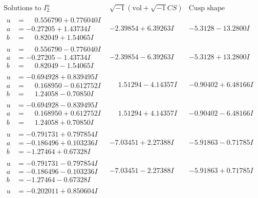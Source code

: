 \documentclass[1p]{elsarticle_modified}
\theoremstyle{definition}
\newcommand{\I}{\sqrt{-1}}
\begin{document}
$$\begin{array}{c|c|c}  
\text{Solutions to }I^u_{2}& \I (\text{vol} + \sqrt{-1}CS) & \text{Cusp shape}\\
 \hline 
\begin{aligned}
u &= \phantom{-}0.556790 + 0.776040 I \\
a &= -0.27205 + 1.43734 I \\
b &= \phantom{-}0.82049 + 1.54065 I\end{aligned}
 & -2.39854 + 6.39263 I & -5.3128 - 13.2800 I \\ \hline\begin{aligned}
u &= \phantom{-}0.556790 - 0.776040 I \\
a &= -0.27205 - 1.43734 I \\
b &= \phantom{-}0.82049 - 1.54065 I\end{aligned}
 & -2.39854 - 6.39263 I & -5.3128 + 13.2800 I \\ \hline\begin{aligned}
u &= -0.694928 + 0.839495 I \\
a &= \phantom{-}0.168950 - 0.612752 I \\
b &= \phantom{-}1.24058 - 0.70850 I\end{aligned}
 & \phantom{-}1.51294 - 4.14357 I & -0.90402 + 6.48166 I \\ \hline\begin{aligned}
u &= -0.694928 - 0.839495 I \\
a &= \phantom{-}0.168950 + 0.612752 I \\
b &= \phantom{-}1.24058 + 0.70850 I\end{aligned}
 & \phantom{-}1.51294 + 4.14357 I & -0.90402 - 6.48166 I \\ \hline\begin{aligned}
u &= -0.791731 + 0.797854 I \\
a &= -0.186496 + 0.103236 I \\
b &= -1.27464 + 0.67328 I\end{aligned}
 & -7.03451 + 2.27388 I & -5.91863 - 0.71785 I \\ \hline\begin{aligned}
u &= -0.791731 - 0.797854 I \\
a &= -0.186496 - 0.103236 I \\
b &= -1.27464 - 0.67328 I\end{aligned}
 & -7.03451 - 2.27388 I & -5.91863 + 0.71785 I \\ \hline\begin{aligned}
u &= -0.202011 + 0.850604 I \\

\end{aligned}
\end{array}$$
\end{document}
